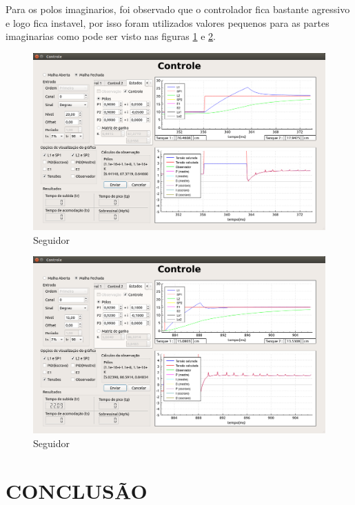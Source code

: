 \documentclass[a4paper,12pt]{article}
\begin{document}
\hspace{4ex}Para os polos imaginarios, foi observado que o controlador fica bastante agressivo e logo fica instavel, por isso foram utilizados valores pequenos para as partes imaginarias como pode ser visto nas figuras \ref{img5} e \ref{img6}.
\begin{figure}[!h]
\centering
\includegraphics[width=13cm]{FotosSeguidor/PolosComplexos}
\caption{Seguidor}
\label{img5}
\end{figure}
\begin{figure}[!h]
\centering
\includegraphics[width=13cm]{FotosSeguidor/PolosComplexos2}
\caption{Seguidor}
\label{img6}
\end{figure}

\newpage


\thispagestyle{main}

\section{CONCLUSÃO}
\end{document}
